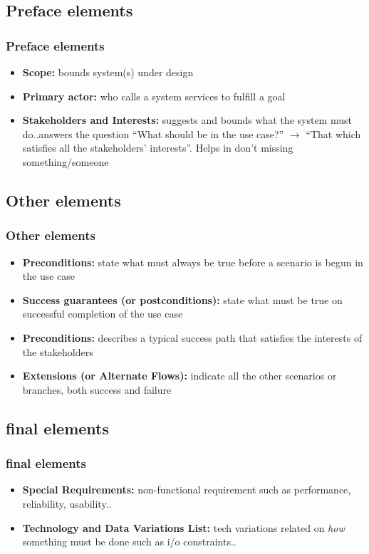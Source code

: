 \documentclass{beamer}
\begin{document}
\subsection{Preface elements}
\begin{frame}
  \frametitle{Preface elements}
  \begin{itemize}
	\item<+-> \textbf{Scope:} bounds system(s) under design
	\item<+-> \textbf{Primary actor:} who calls a system services to fulfill a goal
	\item<+-> \textbf{Stakeholders and Interests:} suggests and bounds what the system must do..answers the question ``What should be in the use case?'' $ \rightarrow $ ``That which satisfies all the stakeholders' interests''. Helps in don't missing something/someone
   \end{itemize}
\end{frame}


\subsection{Other elements}
\begin{frame}
  \frametitle{Other elements}
  \begin{itemize}

	\item<+-> \textbf{Preconditions:} state what must always be true before a scenario is begun in the use case
	\item<+-> \textbf{Success guarantees (or postconditions):} state what must be true on successful completion of the use case
	\item<+-> \textbf{Preconditions:} describes a typical success path that satisfies the interests of the stakeholders
	\item<+-> \textbf{Extensions (or Alternate Flows):} indicate all the other scenarios or branches, both success and failure
   \end{itemize}
\end{frame}

\subsection{final elements}
\begin{frame}
  \frametitle{final elements}
  \begin{itemize}

	\item<+-> \textbf{Special Requirements:} non-functional requirement such as performance, reliability, usability..
	\item<+-> \textbf{Technology and Data Variations List:} tech variations related on \textit{how} something must be done such as i/o constraints..
   \end{itemize}
\end{frame}
\end{document}
